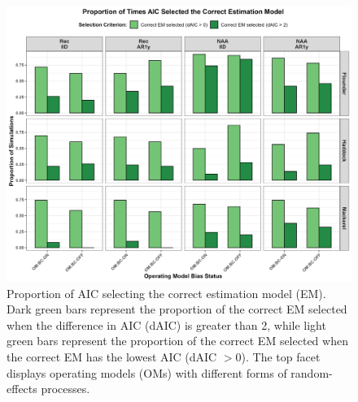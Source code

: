 \documentclass[
  12pt,
]{article}
\begin{document}
\begin{figure}[H]
\centering
\includegraphics[width=\textwidth]{Revised_Figures&Tables/AIC_select.PNG}
\caption{Proportion of AIC selecting the correct estimation model (EM). Dark green bars represent the proportion of the correct EM selected when the difference in AIC (dAIC) is greater than 2, while light green bars represent the proportion of the correct EM selected when the correct EM has the lowest AIC (dAIC $>0$). The top facet displays operating models (OMs) with different forms of random-effects processes.}
\label{fig:AIC_select}
\end{figure}

\pagebreak



\pagebreak
\end{document}
